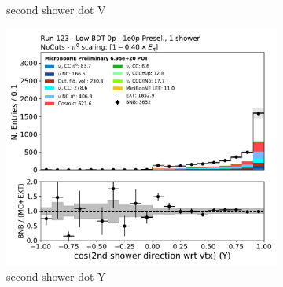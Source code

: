 \begin{figure}[H]
\begin{subfigure}{0.3\textwidth}
    \caption{second shower dot V}
    \end{subfigure}
    \begin{subfigure}{0.3\textwidth}
    \includegraphics[width=1.0\textwidth]{1e0p/Low_BDT_Sideband/secondshower_Y_dot.pdf}
    \caption{second shower dot Y}
    \end{subfigure}
    \caption{} 
    \label{fig:HE_1eNp_1}
\end{figure}

